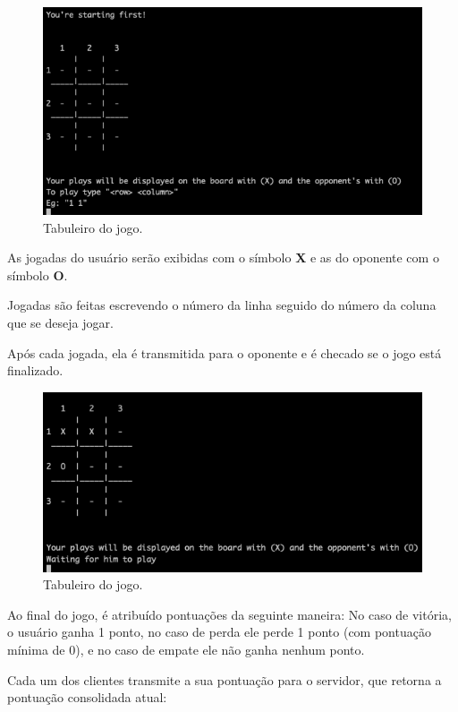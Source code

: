 \documentclass[12pt,a4paper]{report}
\begin{document}
\begin{figure}[H]
    \includegraphics[width=\linewidth]{game_board.png}
    \caption{Tabuleiro do jogo.}
\end{figure}

As jogadas do usuário serão exibidas com o símbolo \textbf{X} e as do oponente com o símbolo \textbf{O}.

Jogadas são feitas escrevendo o número da linha seguido do número da coluna que se deseja jogar.

Após cada jogada, ela é transmitida para o oponente e é checado se o jogo está finalizado.

\begin{figure}[H]
    \includegraphics[width=\linewidth]{game.png}
    \caption{Tabuleiro do jogo.}
\end{figure}

\bigbreak

Ao final do jogo, é atribuído pontuações da seguinte maneira: No caso de vitória, o usuário ganha 1 ponto, no caso de perda ele perde 1 ponto (com pontuação mínima de 0), e no caso de empate ele não ganha nenhum ponto.

Cada um dos clientes transmite a sua pontuação para o servidor, que retorna a pontuação consolidada atual:
\end{document}
